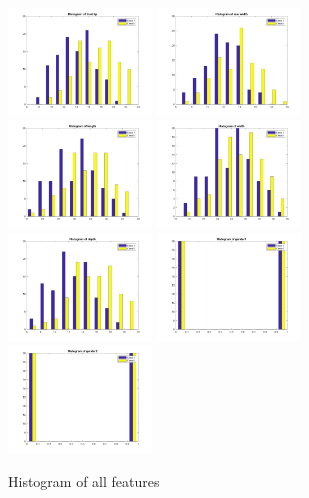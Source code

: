 \documentclass[a4paper]{article}
\begin{document}
\begin{spacing}{2.0}
\begin{enumerate}
\begin{figure}[htbp] 
\centering
\includegraphics[width=1.5in]{feature1.jpg} 
\includegraphics[width=1.5in]{feature2.jpg} 
\includegraphics[width=1.5in]{feature3.jpg} 
\includegraphics[width=1.5in]{feature4.jpg} 
\includegraphics[width=1.5in]{feature5.jpg} 
\includegraphics[width=1.5in]{feature6.jpg} 
\includegraphics[width=1.5in]{feature7.jpg} 
\caption{Histogram of all features }\label{hist} 
\end{figure} 


\end{enumerate}
\end{spacing}
\end{document}
